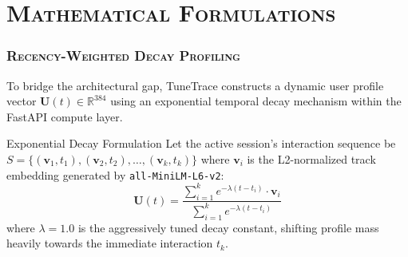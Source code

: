 \documentclass[aspectratio=169,10pt]{beamer}
\begin{document}
\section{\textsc{Mathematical Formulations}}
\begin{frame}
  \frametitle{\textsc{Recency-Weighted Decay Profiling}}

  To bridge the architectural gap, TuneTrace constructs a dynamic user profile vector $\mathbf{U}(t) \in \mathbb{R}^{384}$ using an exponential temporal decay mechanism within the FastAPI compute layer.
  
  \vspace{3mm}
  \begin{block}{Exponential Decay Formulation}
    \fontsize{8pt}{10pt}\selectfont
    Let the active session's interaction sequence be $S = \{(\mathbf{v}_1, t_1), (\mathbf{v}_2, t_2), \dots, (\mathbf{v}_k, t_k)\}$ where $\mathbf{v}_i$ is the L2-normalized track embedding generated by \texttt{all-MiniLM-L6-v2}:
    \begin{equation}
        \mathbf{U}(t) = \frac{\sum_{i=1}^k e^{-\lambda(t - t_i)} \cdot \mathbf{v}_i}{\sum_{i=1}^k e^{-\lambda(t - t_i)}}
    \end{equation}
    where $\lambda = 1.0$ is the aggressively tuned decay constant, shifting profile mass heavily towards the immediate interaction $t_k$.
  \end{block}
\end{frame}
\end{document}
